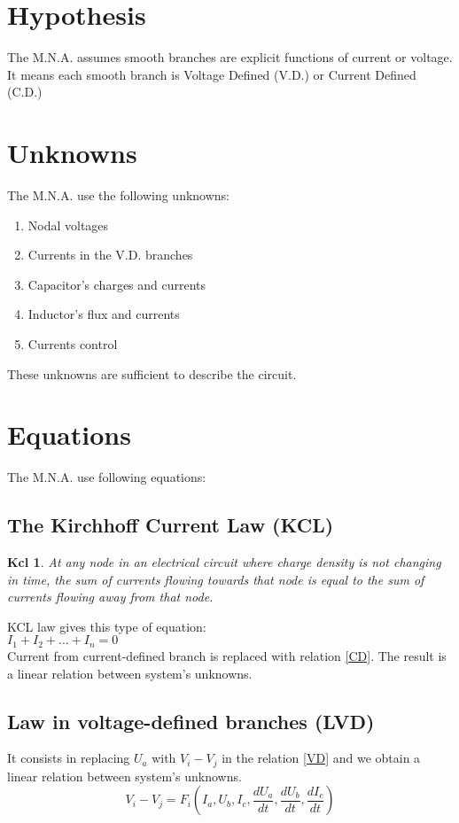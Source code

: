 \documentclass[10pt]{article}
\begin{document}
\section{Hypothesis\\}
The M.N.A. assumes smooth branches are explicit functions of current or voltage. It means each smooth
branch is Voltage Defined (V.D.) or Current Defined (C.D.)\\
\section{Unknowns}
The M.N.A. use the following unknowns:
\begin{enumerate}
\item Nodal voltages\\
\item Currents in the V.D. branches\\
\item Capacitor's charges and currents
\item Inductor's flux and currents
\item Currents control
\end{enumerate}
These unknowns are sufficient to describe the circuit.
\section{Equations}
The M.N.A. use following equations:
\subsection{The Kirchhoff Current Law (KCL)}
\newtheorem{kcl}{Kcl}
\begin{kcl}
At any node in an electrical circuit where charge density is not changing in time, the sum of
currents flowing towards that node is equal to the sum of currents flowing away from that node.
\end{kcl}
KCL law gives this type of equation:\\
$I_{1}+I_{2}+...+I_{n}=0$\\
Current from current-defined branch is replaced with relation \ref{CD}. The result is a linear relation between system's unknowns.
\subsection{Law in voltage-defined branches (LVD)}
It consists in replacing $U_{a}$ with $V_{i}-V_{j}$ in the relation \ref{VD} and we obtain a linear relation between system's unknowns.
\[V_{i}-V_{j}=F_{i}(I_{a},U_{b},I_{c},\frac{dU_a}{dt},\frac{dU_b}{dt},\frac{dI_{c}}{dt})\]
\end{document}
